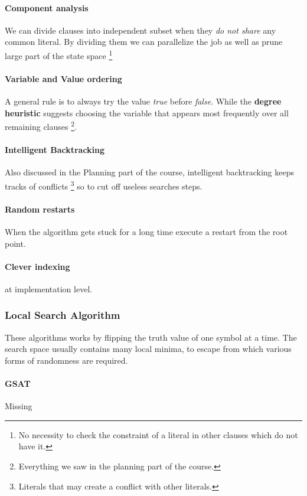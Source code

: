 \documentclass[10pt,a4paper]{article}
\begin{document}
\paragraph{Component analysis} We can divide clauses into independent subset when they \textit{do not share} any common literal. By dividing them we can parallelize the job as well as prune large part of the state space 	\footnote{No necessity to check the constraint of a literal in other clauses which do not have it. }

\paragraph{Variable and Value ordering} A general rule is to always try the value \textit{true} before \textit{false}. While the \textbf{degree heuristic} suggests choosing the variable that appears most frequently over all remaining clauses \footnote{Everything we saw in the planning part of the course.}.

\paragraph{Intelligent Backtracking} Also discussed in the Planning part of the course, intelligent backtracking keeps tracks of conflicts \footnote{Literals that may create a conflict with other literals.} so to cut off useless searches steps.

\paragraph{Random restarts} When the algorithm gets stuck for a long time execute a restart from the root point.

\paragraph{Clever indexing} at implementation level.

\subsubsection{Local Search Algorithm}
These algorithms works by flipping the truth value of one symbol at a time. The search space usually contains many local minima, to escape from which various forms of randomness are required. 

\paragraph{GSAT} Missing
\end{document}
